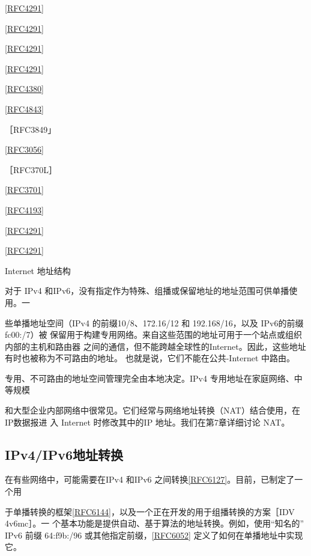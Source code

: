 \href{https://www.rfc-editor.org/rfc/rfc4291}{[RFC4291]}

\href{https://www.rfc-editor.org/rfc/rfc4291}{[RFC4291]}

\href{https://www.rfc-editor.org/rfc/rfc4291}{[RFC4291]}

\href{https://www.rfc-editor.org/rfc/rfc4291}{[RFC4291]}

\href{https://www.rfc-editor.org/rfc/rfc4380}{[RFC4380]}

\href{https://www.rfc-editor.org/rfc/rfc4843}{[RFC4843]}

［RFC3849」

\href{https://www.rfc-editor.org/rfc/rfc3056}{[RFC3056]}

［RFC370L］

\href{https://www.rfc-editor.org/rfc/rfc3701}{[RFC3701]}

\href{https://www.rfc-editor.org/rfc/rfc4193}{[RFC4193]}

\href{https://www.rfc-editor.org/rfc/rfc4291}{[RFC4291]}

\href{https://www.rfc-editor.org/rfc/rfc4291}{[RFC4291]}

Internet 地址结构

对于 IPv4 和IPv6，没有指定作为特殊、组播或保留地址的地址范围可供单播使用。一

些单播地址空间（IPv4 的前缀10/8、172.16/12 和 192.168/16，以及 IPv6的前缀 fc00:/7）被
保留用于构建专用网络。来自这些范围的地址可用于一个站点或组织内部的主机和路由器
之间的通信，但不能跨越全球性的Internet。因此，这些地址有时也被称为不可路由的地址。
也就是说，它们不能在公共-Internet 中路由。

专用、不可路由的地址空间管理完全由本地决定。IPv4 专用地址在家庭网络、中等规模

和大型企业内部网络中很常见。它们经常与网络地址转换（NAT）结合使用，在IP数据报进
入 Internet 时修改其中的IP 地址。我们在第7章详细讨论 NAT。

\subsection{IPv4/IPv6地址转换}
在有些网络中，可能需要在IPv4 和IPv6 之间转换\href{https://www.rfc-editor.org/rfc/rfc6127}{[RFC6127]}。目前，已制定了一个用

于单播转换的框架\href{https://www.rfc-editor.org/rfc/rfc6144}{[RFC6144]}，以及一个正在开发的用于组播转换的方案［IDV 4v6mc］。一
个基本功能是提供自动、基于算法的地址转换。例如，使用“知名的” IPv6 前缀 64:f9b:/96
或其他指定前缀，\href{https://www.rfc-editor.org/rfc/rfc6052}{[RFC6052]} 定义了如何在单播地址中实现它。

